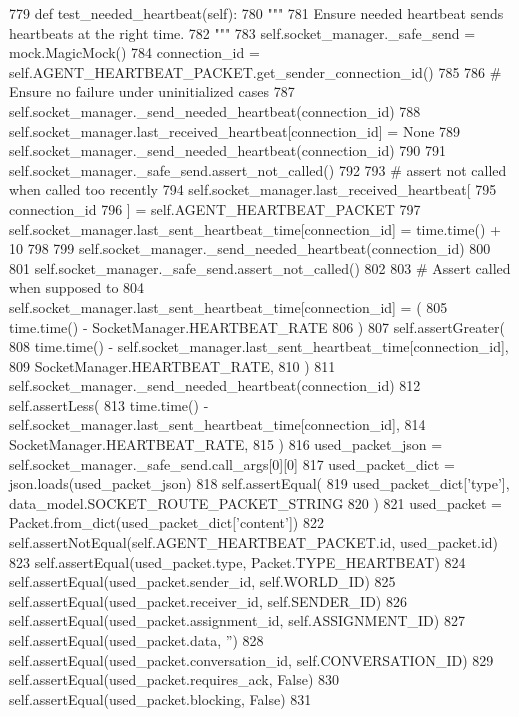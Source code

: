 \begin{DoxyCode}
779     \textcolor{keyword}{def }test\_needed\_heartbeat(self):
780         \textcolor{stringliteral}{"""}
781 \textcolor{stringliteral}{        Ensure needed heartbeat sends heartbeats at the right time.}
782 \textcolor{stringliteral}{        """}
783         self.socket\_manager.\_safe\_send = mock.MagicMock()
784         connection\_id = self.AGENT\_HEARTBEAT\_PACKET.get\_sender\_connection\_id()
785 
786         \textcolor{comment}{# Ensure no failure under uninitialized cases}
787         self.socket\_manager.\_send\_needed\_heartbeat(connection\_id)
788         self.socket\_manager.last\_received\_heartbeat[connection\_id] = \textcolor{keywordtype}{None}
789         self.socket\_manager.\_send\_needed\_heartbeat(connection\_id)
790 
791         self.socket\_manager.\_safe\_send.assert\_not\_called()
792 
793         \textcolor{comment}{# assert not called when called too recently}
794         self.socket\_manager.last\_received\_heartbeat[
795             connection\_id
796         ] = self.AGENT\_HEARTBEAT\_PACKET
797         self.socket\_manager.last\_sent\_heartbeat\_time[connection\_id] = time.time() + 10
798 
799         self.socket\_manager.\_send\_needed\_heartbeat(connection\_id)
800 
801         self.socket\_manager.\_safe\_send.assert\_not\_called()
802 
803         \textcolor{comment}{# Assert called when supposed to}
804         self.socket\_manager.last\_sent\_heartbeat\_time[connection\_id] = (
805             time.time() - SocketManager.HEARTBEAT\_RATE
806         )
807         self.assertGreater(
808             time.time() - self.socket\_manager.last\_sent\_heartbeat\_time[connection\_id],
809             SocketManager.HEARTBEAT\_RATE,
810         )
811         self.socket\_manager.\_send\_needed\_heartbeat(connection\_id)
812         self.assertLess(
813             time.time() - self.socket\_manager.last\_sent\_heartbeat\_time[connection\_id],
814             SocketManager.HEARTBEAT\_RATE,
815         )
816         used\_packet\_json = self.socket\_manager.\_safe\_send.call\_args[0][0]
817         used\_packet\_dict = json.loads(used\_packet\_json)
818         self.assertEqual(
819             used\_packet\_dict[\textcolor{stringliteral}{'type'}], data\_model.SOCKET\_ROUTE\_PACKET\_STRING
820         )
821         used\_packet = Packet.from\_dict(used\_packet\_dict[\textcolor{stringliteral}{'content'}])
822         self.assertNotEqual(self.AGENT\_HEARTBEAT\_PACKET.id, used\_packet.id)
823         self.assertEqual(used\_packet.type, Packet.TYPE\_HEARTBEAT)
824         self.assertEqual(used\_packet.sender\_id, self.WORLD\_ID)
825         self.assertEqual(used\_packet.receiver\_id, self.SENDER\_ID)
826         self.assertEqual(used\_packet.assignment\_id, self.ASSIGNMENT\_ID)
827         self.assertEqual(used\_packet.data, \textcolor{stringliteral}{''})
828         self.assertEqual(used\_packet.conversation\_id, self.CONVERSATION\_ID)
829         self.assertEqual(used\_packet.requires\_ack, \textcolor{keyword}{False})
830         self.assertEqual(used\_packet.blocking, \textcolor{keyword}{False})
831 
\end{DoxyCode}
